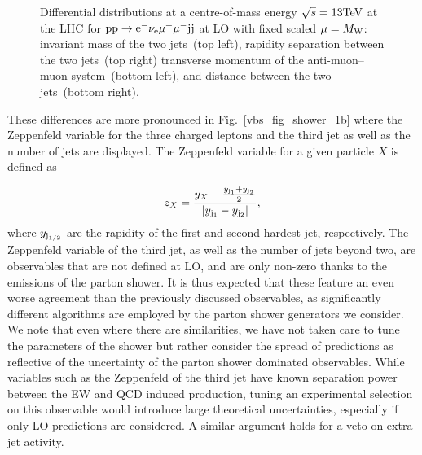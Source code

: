 \documentclass[11pt]{cernrep}
\begin{document}
\begin{figure}[htbp]
\begin{center}
\caption{Differential distributions at a centre-of-mass energy $\sqrt{s}=13{\rm TeV}$ at the LHC for ${\rm p} {\rm p}
  \to {\rm e}^-  \nu_{\rm e}  \mu^+ \mu^- {\rm j} {\rm j}$ at LO with fixed scaled $\mu = M_{\rm W}$: 
                invariant mass of the two jets~(top left),
                rapidity separation between the two jets~(top right)
                transverse momentum of the anti-muon--muon system~(bottom left), and
                distance between the two jets~(bottom right).}
\label{vbs_fig_shower_1a}
\end{center}
\end{figure}

These differences are more pronounced in Fig.~\ref{vbs_fig_shower_1b} where the Zeppenfeld variable for the three charged leptons and the third jet as well as the number of jets are displayed.
The Zeppenfeld variable for a given particle $X$ is defined as

\begin{equation}
  z_{X} = \frac{y_{X}-\frac{y_{{\rm j}_1}+y_{{\rm j}_2}}2}{|y_{{\rm j}_1}-y_{{\rm j}_2}|} ,
\end{equation}
%
where $y_{{\rm j}_{1/2}}$ are the rapidity of the first and second hardest jet, respectively.
The Zeppenfeld variable of the third jet, as well as the number of jets beyond two, are observables that are not defined at LO,
and are only non-zero thanks to the emissions of the parton shower.
It is thus expected that these feature an even worse agreement than the previously discussed observables, as 
significantly different algorithms are employed by the parton shower generators we consider. 
We note that even where there are similarities, we have not taken care to tune the parameters
of the shower but rather consider the spread of predictions as reflective of the uncertainty 
of the parton shower dominated observables. While variables such as the Zeppenfeld of the third jet
have known separation power between the EW and QCD induced production, tuning an experimental selection 
on this observable would introduce large theoretical uncertainties, especially if only LO predictions
are considered. A similar argument holds for a veto on extra jet activity.
\end{document}
